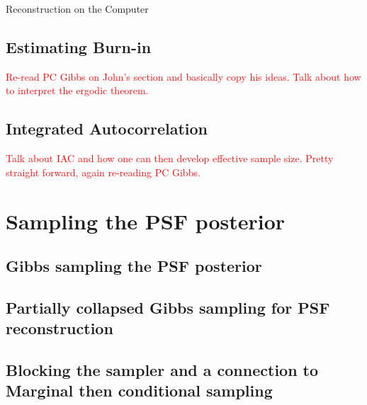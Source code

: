 \begin{chapter}{Reconstruction on the Computer}
  \subsection{Estimating Burn-in}
  \textcolor{red}{
  Re-read PC Gibbs on John's section and basically copy his ideas.
  Talk about how to interpret the ergodic theorem.
  }
  \subsection{Integrated Autocorrelation}
  \textcolor{red}{
  Talk about IAC and how one can then develop effective sample size.  
  Pretty straight forward, again re-reading PC Gibbs.  
}

\section{Sampling the PSF posterior}
  \subsection{Gibbs sampling the PSF posterior}
  \subsection{Partially collapsed Gibbs sampling for PSF reconstruction}
  \subsection{Blocking the sampler and a connection to Marginal then conditional sampling}
\end{chapter}
